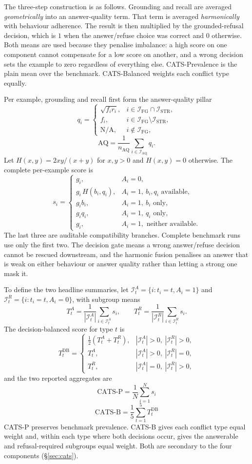 The three-step construction is as follows. Grounding and recall are averaged
\emph{geometrically} into an answer-quality term. That term is averaged
\emph{harmonically} with behaviour adherence. The result is then multiplied by the
grounded-refusal decision, which is $1$ when the answer/refuse choice was correct
and $0$ otherwise. Both means are used because they penalise imbalance: a high
score on one component cannot compensate for a low score on another, and a wrong
decision sets the example to zero regardless of everything else. CATS-Prevalence
is the plain mean over the benchmark. CATS-Balanced weights each conflict type
equally.

Per example, grounding and recall first form the answer-quality pillar
\[
q_i=\begin{cases}
\sqrt{f_i r_i},& i\in\mathcal{I}_{\mathrm{FG}}\cap\mathcal{I}_{\mathrm{STR}},\\
f_i,& i\in\mathcal{I}_{\mathrm{FG}}\setminus\mathcal{I}_{\mathrm{STR}},\\
\text{N/A},& i\notin\mathcal{I}_{\mathrm{FG}},
\end{cases}
\]
\[
\mathrm{AQ}=\frac{1}{n_{\mathrm{AQ}}}\sum_{i\in\mathcal{I}_{\mathrm{AQ}}}q_i.
\]
Let $H(x,y)=2xy/(x+y)$ for $x,y>0$ and $H(x,y)=0$ otherwise. The complete
per-example score is
\[
s_i=\begin{cases}
g_i,& A_i=0,\\
g_i\,H(b_i,q_i),& A_i=1,\ b_i,q_i\text{ available},\\
g_i b_i,& A_i=1,\ b_i\text{ only},\\
g_i q_i,& A_i=1,\ q_i\text{ only},\\
g_i,& A_i=1,\text{ neither available}.
\end{cases}
\]
The last three are auditable compatibility branches. Complete benchmark runs use
only the first two. The decision gate means a wrong answer/refuse decision cannot
be rescued downstream, and the harmonic fusion penalises an answer that is weak
on either behaviour or answer quality rather than letting a strong one mask it.

To define the two headline summaries, let
$\mathcal{I}^{A}_t=\{i:t_i=t,A_i=1\}$ and $\mathcal{I}^{R}_t=\{i:t_i=t,A_i=0\}$,
with subgroup means
\[
T^{A}_t=\frac{1}{|\mathcal{I}^{A}_t|}\sum_{i\in\mathcal{I}^{A}_t}s_i,
\qquad
T^{R}_t=\frac{1}{|\mathcal{I}^{R}_t|}\sum_{i\in\mathcal{I}^{R}_t}s_i.
\]
The decision-balanced score for type $t$ is
\[
T^{\mathrm{DB}}_t=\begin{cases}
\tfrac{1}{2}(T^{A}_t+T^{R}_t),& |\mathcal{I}^{A}_t|>0,\ |\mathcal{I}^{R}_t|>0,\\
T^{A}_t,& |\mathcal{I}^{A}_t|>0,\ |\mathcal{I}^{R}_t|=0,\\
T^{R}_t,& |\mathcal{I}^{A}_t|=0,\ |\mathcal{I}^{R}_t|>0,
\end{cases}
\]
and the two reported aggregates are
\[
\boxed{\ \mathrm{CATS\text{-}P}=\frac{1}{N}\sum_{i=1}^{N}s_i\ }
\]
\[
\boxed{\ \mathrm{CATS\text{-}B}=\frac{1}{5}\sum_{t=1}^{5}T^{\mathrm{DB}}_t\ }
\]
CATS-P preserves benchmark prevalence. CATS-B gives each conflict type equal
weight and, within each type where both decisions occur, gives the answerable and
refusal-required subgroups equal weight. Both are secondary to the four
components (\S\ref{sec:cats}).

